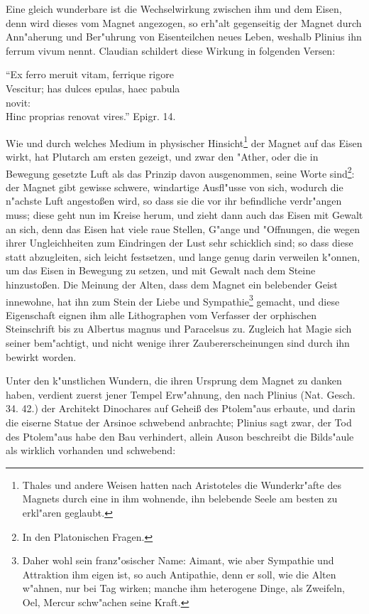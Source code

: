 \documentclass[a4paper, 11pt, oneside, polutonikogreek, german]{article}
\begin{document}
Eine gleich wunderbare ist die Wechselwirkung zwischen ihm und dem Eisen, denn wird dieses vom Magnet angezogen, so erh"alt gegenseitig der Magnet durch Ann"aherung und Ber"uhrung von Eisenteilchen neues Leben, weshalb Plinius ihn ferrum vivum nennt. Claudian schildert diese Wirkung in folgenden Versen:

"`Ex ferro meruit vitam, ferrique rigore\\
\hspace*{0.5cm} Vescitur; has dulces epulas, haec pabula\\
\hspace*{1.5cm} novit:\\
\hspace*{0.5cm} Hinc proprias renovat vires."' Epigr. 14.

Wie und durch welches Medium in physischer Hinsicht\footnote{Thales und andere Weisen hatten nach Aristoteles die Wunderkr"afte des Magnets durch eine in ihm wohnende, ihn belebende Seele am besten zu erkl"aren geglaubt.} der Magnet auf das Eisen wirkt, hat Plutarch am ersten gezeigt, und zwar den "Ather, oder die in Bewegung gesetzte Luft als das Prinzip davon ausgenommen, seine Worte sind\footnote{In den Platonischen Fragen.}: der Magnet gibt gewisse schwere, windartige Ausfl"usse von sich, wodurch die n"achste Luft angestoßen wird, so dass sie die vor ihr befindliche verdr"angen muss; diese geht nun im Kreise herum, und zieht dann auch das Eisen mit Gewalt an sich, denn das Eisen hat viele raue Stellen, G"ange und "Offnungen, die wegen ihrer Ungleichheiten zum Eindringen der Lust sehr schicklich sind; so dass diese statt abzugleiten, sich leicht festsetzen, und lange genug darin verweilen k"onnen, um das Eisen in Bewegung zu setzen, und mit Gewalt nach dem Steine hinzustoßen. Die Meinung der Alten, dass dem Magnet ein belebender Geist innewohne, hat ihn zum Stein der Liebe und Sympathie\footnote{Daher wohl sein franz"osischer Name: Aimant, wie aber Sympathie und Attraktion ihm eigen ist, so auch Antipathie, denn er soll, wie die Alten w"ahnen, nur bei Tag wirken; manche ihm heterogene Dinge, als Zweifeln, Oel, Mercur schw"achen seine Kraft.} gemacht, und diese Eigenschaft eignen ihm alle Lithographen vom Verfasser der orphischen Steinschrift bis zu Albertus magnus und Paracelsus zu. Zugleich hat Magie sich seiner bem"achtigt, und nicht wenige ihrer Zaubererscheinungen sind durch ihn bewirkt worden.

Unter den k"unstlichen Wundern, die ihren Ursprung dem Magnet zu danken haben, verdient zuerst jener Tempel Erw"ahnung, den nach Plinius (Nat. Gesch. 34. 42.) der Architekt Dinochares auf Geheiß des Ptolem"aus erbaute, und darin die eiserne Statue der Arsinoe schwebend anbrachte; Plinius sagt zwar, der Tod des Ptolem"aus habe den Bau verhindert, allein Auson beschreibt die Bilds"aule als wirklich vorhanden und schwebend:
\end{document}
